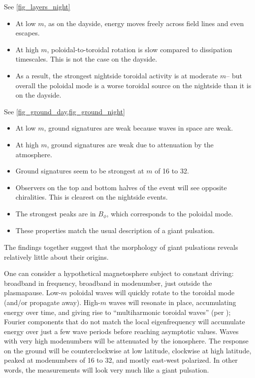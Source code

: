 \documentclass{article}
\newcommand{\azm}{\ensuremath{m}\xspace}
\begin{document}
See \cref{fig_layers_night}

\begin{itemize}
    \item At low \azm, as on the dayside, energy moves freely across field lines and even escapes.
    \item At high \azm, poloidal-to-toroidal rotation is slow compared to dissipation timescales. This is not the case on the dayside.
    \item As a result, the strongest nightside toroidal activity is at moderate \azm -- but overall the poloidal mode is a worse toroidal source on the nightside than it is on the dayside.
\end{itemize}

See \cref{fig_ground_day,fig_ground_night}

\begin{itemize}
    \item At low \azm, ground signatures are weak because waves in space are weak.
    \item At high \azm, ground signatures are weak due to attenuation by the atmosphere.
    \item Ground signatures seem to be strongest at \azm of 16 to 32.
    \item Observers on the top and bottom halves of the event will see opposite chiralities. This is clearest on the nightside events.
    \item The strongest peaks are in $B_\phi$, which corresponds to the poloidal mode.
    \item These properties match the usual description of a giant pulsation.
\end{itemize}

The findings together suggest that the morphology of giant pulsations reveals relatively little about their origins.

One can consider a hypothetical magnetosphere subject to constant driving: broadband in frequency, broadband in modenumber, just outside the plasmapause. Low-\azm poloidal waves will quickly rotate to the toroidal mode (and/or propagate away). High-\azm waves will resonate in place, accumulating energy over time, and giving rise to ``multiharmonic toroidal waves'' (per \cite{takahashi_2011}); Fourier components that do not match the local eigenfrequency will accumulate energy over just a few wave periods before reaching asymptotic values. Waves with very high modenumbers will be attenuated by the ionosphere. The response on the ground will be counterclockwise at low latitude, clockwise at high latitude, peaked at modenumbers of 16 to 32, and mostly east-west polarized. In other words, the measurements will look very much like a giant pulsation.
\end{document}
